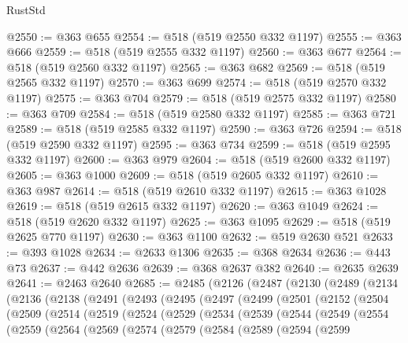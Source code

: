 \begin{lexlean}{RustStd}
\begin{coremodule}
@2550 := @363 @655
@2554 := @518 (@519 @2550 @332 @1197)
@2555 := @363 @666
@2559 := @518 (@519 @2555 @332 @1197)
@2560 := @363 @677
@2564 := @518 (@519 @2560 @332 @1197)
@2565 := @363 @682
@2569 := @518 (@519 @2565 @332 @1197)
@2570 := @363 @699
@2574 := @518 (@519 @2570 @332 @1197)
@2575 := @363 @704
@2579 := @518 (@519 @2575 @332 @1197)
@2580 := @363 @709
@2584 := @518 (@519 @2580 @332 @1197)
@2585 := @363 @721
@2589 := @518 (@519 @2585 @332 @1197)
@2590 := @363 @726
@2594 := @518 (@519 @2590 @332 @1197)
@2595 := @363 @734
@2599 := @518 (@519 @2595 @332 @1197)
@2600 := @363 @979
@2604 := @518 (@519 @2600 @332 @1197)
@2605 := @363 @1000
@2609 := @518 (@519 @2605 @332 @1197)
@2610 := @363 @987
@2614 := @518 (@519 @2610 @332 @1197)
@2615 := @363 @1028
@2619 := @518 (@519 @2615 @332 @1197)
@2620 := @363 @1049
@2624 := @518 (@519 @2620 @332 @1197)
@2625 := @363 @1095
@2629 := @518 (@519 @2625 @770 @1197)
@2630 := @363 @1100
@2632 := @519 @2630 @521
@2633 := @393 @1028
@2634 := @2633 @1306
@2635 := @368 @2634
@2636 := @443 @73
@2637 := @442 @2636
@2639 := @368 @2637 @382
@2640 := @2635 @2639
@2641 := @2463 @2640
@2685 := @2485
    (@2126
      (@2487
        (@2130
          (@2489
            (@2134
              (@2136
                (@2138
                  (@2491
                    (@2493
                      (@2495
                        (@2497
                          (@2499
                            (@2501
                              (@2152
                                (@2504
                                  (@2509
                                    (@2514
                                      (@2519
                                        (@2524
                                          (@2529
                                            (@2534
                                              (@2539
                                                (@2544
                                                  (@2549
                                                    (@2554
                                                      (@2559
                                                        (@2564
                                                          (@2569
                                                            (@2574
                                                              (@2579
                                                                (@2584
                                                                  (@2589
                                                                    (@2594
                                                                      (@2599

\end{coremodule}
\end{lexlean}
